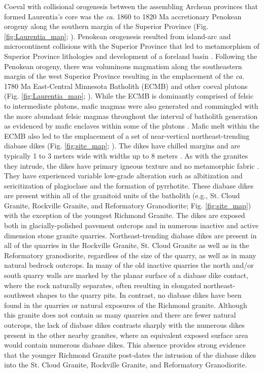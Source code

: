 \documentclass[draft]{agujournal2019}
\begin{document}
Coeval with collisional orogenesis between the assembling Archean provinces that formed Laurentia's core was the \textit{ca.} 1860 to 1820 Ma accretionary Penokean orogeny along the southern margin of the Superior Province (Fig. \ref{fig:Laurentia_map}; ). Penokean orogenesis resulted from island-arc and microcontinent collisions with the Superior Province that led to metamorphism of Superior Province lithologies and development of a foreland basin \cite{Schulz2007a, Holm2019a}. Following the Penokean orogeny, there was voluminous magmatism along the southeastern margin of the west Superior Province resulting in the emplacement of the \textit{ca.} 1780 Ma East-Central Minnesota Batholith (ECMB) and other coeval plutons (Fig. \ref{fig:Laurentia_map}; ). While the ECMB is dominantly comprised of felsic to intermediate plutons, mafic magmas were also generated and commingled with the more abundant felsic magmas throughout the interval of batholith generation as evidenced by mafic enclaves within some of the plutons \cite{Boerboom2005b, Boerboom2011b, Schmitz2018a}. Mafic melt within the ECMB also led to the emplacement of a set of near-vertical northeast-trending diabase dikes (Fig. \ref{fig:site_map}; ).  The dikes have chilled margins and are typically 1 to 3 meters wide with widths up to 8 meters \cite{Boerboom2005b}. As with the granites they intrude, the dikes have primary igneous texture and no metamorphic fabric \cite{Boerboom2005b}. They have experienced variable low-grade alteration such as albitization and sericitization of plagioclase and the formation of pyrrhotite. These diabase dikes are present within all of the granitoid units of the batholith (e.g., St. Cloud Granite, Rockville Granite, and Reformatory Granodiorite; Fig. \ref{fig:site_map}) with the exception of the youngest Richmond Granite. The dikes are exposed both in glacially-polished pavement outcrops and in numerous inactive and active dimension stone granite quarries. Northeast-trending diabase dikes are present in all of the quarries in the Rockville Granite, St. Cloud Granite as well as in the Reformatory granodiorite, regardless of the size of the quarry, as well as in many natural bedrock outcrops. In many of the old inactive quarries the north and/or south quarry walls are marked by the planar surface of a diabase dike contact, where the rock naturally separates, often resulting in elongated northeast-southwest shapes to the quarry pits. In contrast, no diabase dikes have been found in the quarries or natural exposures of the Richmond granite. Although this granite does not contain as many quarries and there are fewer natural outcrops, the lack of diabase dikes contrasts sharply with the numerous dikes present in the other nearby granites, where an equivalent exposed surface area would contain numerous diabase dikes. This absence provides strong evidence that the younger Richmond Granite post-dates the intrusion of the diabase dikes into the St. Cloud Granite, Rockville Granite, and Reformatory Granodiorite.
\end{document}
